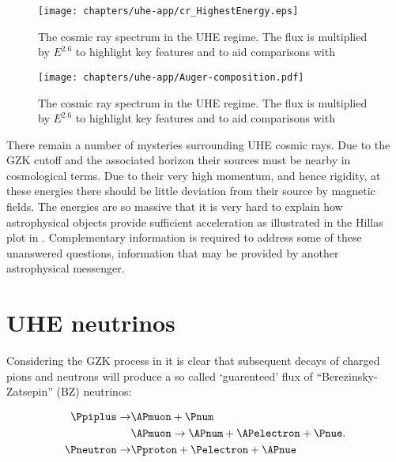 \begin{figure}[htpb]
  \centering
  \texttt{[image: chapters/uhe-app/cr\_HighestEnergy.eps]}
  \caption{The cosmic ray spectrum in the UHE regime. The flux is multiplied by $E^{2.6}$ to highlight key features and to aid comparisons with }
  \label{fig:uhe-app:Cosmic-Rays:UHE-Spectrum}
\end{figure}


\begin{figure}[htpb]
  \centering
  \texttt{[image: chapters/uhe-app/Auger-composition.pdf]}
  \caption{The cosmic ray spectrum in the UHE regime. The flux is multiplied by $E^{2.6}$ to highlight key features and to aid comparisons with }
  \label{fig:uhe-app:Cosmic-Rays:Auger-Composition}
\end{figure}



There remain a number of mysteries surrounding UHE cosmic rays. Due to the GZK cutoff and the associated horizon their sources must be nearby in cosmological terms. Due to their very high momentum, and hence rigidity, at these energies there should be little deviation from their source by magnetic fields. The energies are so massive that it is very hard to explain how astrophysical objects provide sufficient acceleration as illustrated in the Hillas plot in . Complementary information is required to address some of these unanswered questions, information that may be provided by another astrophysical messenger.

\section{UHE neutrinos}
\label{sec:uhe-app:UHEN}


Considering the GZK process in  it is clear that subsequent decays of charged pions and neutrons will produce a so called `guarenteed' flux of ``Berezinsky-Zatsepin'' (BZ) neutrinos:


\begin{equation}
  \begin{split}
    \Ppiplus \rightarrow & \APmuon + \Pnum\\
    & \APmuon \rightarrow \APnum + \APelectron + \Pnue\\
    \Pneutron \rightarrow & \Pproton + \Pelectron + \APnue
  \end{split}.
  \label{eq:uhe-app:UHEN:photo-pion-production}
\end{equation}

